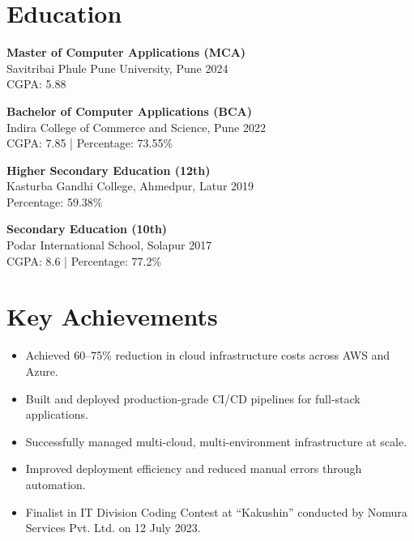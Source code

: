 \documentclass[a4paper,10pt]{article}
\begin{document}
\section*{Education}

\textbf{Master of Computer Applications (MCA)} \\
Savitribai Phule Pune University, Pune \hfill 2024 \\
CGPA: 5.88

\vspace{6pt}

\textbf{Bachelor of Computer Applications (BCA)} \\
Indira College of Commerce and Science, Pune \hfill 2022 \\
CGPA: 7.85 \quad | \quad Percentage: 73.55\%

\vspace{6pt}

\textbf{Higher Secondary Education (12th)} \\
Kasturba Gandhi College, Ahmedpur, Latur \hfill 2019 \\
Percentage: 59.38\%

\vspace{6pt}

\textbf{Secondary Education (10th)} \\
Podar International School, Solapur \hfill 2017 \\
CGPA: 8.6 \quad | \quad Percentage: 77.2\%

\section*{Key Achievements}

\begin{itemize}[leftmargin=*]
    \item Achieved 60--75\% reduction in cloud infrastructure costs across AWS and Azure.
    \item Built and deployed production-grade CI/CD pipelines for full-stack applications.
    \item Successfully managed multi-cloud, multi-environment infrastructure at scale.
    \item Improved deployment efficiency and reduced manual errors through automation.
    \item Finalist in IT Division Coding Contest at ``Kakushin'' conducted by Nomura Services Pvt. Ltd. on 12 July 2023.
\end{itemize}
\end{document}
